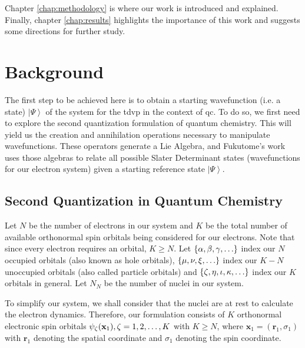 \documentclass{aux/ttuthes2007}
\newcommand{\bx}{\bm{x}}
\newcommand{\br}{\bm{r}}
\newcommand{\ket}[1]{\ensuremath{\left|#1\right\rangle}}
\newcommand{\paren}[1]{\left( #1 \right)}
\newcommand{\elec}{N}
\newcommand{\nuc}{N_{N}}
\newcommand{\orb}{K}
\newcommand{\uo}[1]{
		\IfEqCase{#1}{
			{0}{\mu}
			{1}{\nu}
			{2}{\xi}
		}[\PackageError{uo}{Undefined option to uo: #1}{}]
}
\newcommand{\oo}[1]{
		\IfEqCase{#1}{
			{0}{\alpha}
			{1}{\beta}
			{2}{\gamma}
		}[\PackageError{unocorb}{Undefined option to unuo: #1}{}]
}
\newcommand{\go}[1]{
		\IfEqCase{#1}{
			{0}{\zeta}
			{1}{\eta}
			{2}{\iota}
			{3}{\kappa}
		}[\PackageError{unocorb}{Undefined option to go: #1}{}]
}
\newcommand{\psig}[1]{
	\psi_{\go{#1}}
}
\begin{document}
Chapter \ref{chap:methodology} is where our work is introduced and explained. Finally, chapter \ref{chap:results} highlights the importance of this work and suggests some directions for further study.

\chapter{\textbf{Background}}\label{chap:background}

The first step to be achieved here is to obtain a starting wavefunction (i.e. a state) $\ket\Psi$ of the system for the \gls{tdvp} in the context of \gls{qc}. 
To do so, we first need to explore the second quantization formulation of quantum chemistry. 
This will yield us the creation and annihilation operations necessary to manipulate wavefunctions.
These operators generate a Lie Algebra, and Fukutome's work  uses those algebras to relate all possible Slater Determinant states (wavefunctions for our electron system) given a starting reference state $\ket\Psi$.

\section {\textbf{Second Quantization in Quantum Chemistry}}

Let $\elec$ be the number of electrons in our system and $\orb$ be the total number of available orthonormal spin orbitals being considered for our electrons.
Note that since every electron requires an orbital, $\orb \geq \elec$.
Let 
$\{\oo{0}, \oo{1}, \oo{2}, \ldots\}$
index our $\elec$ occupied orbitals (also known as hole orbitals), 
$\{\uo{0},\uo{1},\uo{2}, \ldots\}$ 
index  our $\orb - \elec$ unoccupied orbitals (also called particle orbitals) and 
$\{\go{0}, \go{1}, \go{2}, \go{3}, \ldots\}$
index our $\orb$ orbitals in general.
Let $\nuc$ be the number of nuclei in our system.

To simplify our system, we shall consider that the nuclei are at rest to calculate the electron dynamics. Therefore, our formulation consists of $\orb$ orthonormal electronic spin orbitals $\psig 0(\mathbf{x}_1), \go{0} = 1, 2, \ldots, \orb$ with $\orb \geq \elec$, where $\bx_1 = \paren{\br_1, \sigma_1}$ with $\br_1$ denoting the spatial coordinate and $\sigma_1$ denoting the spin coordinate.
\end{document}
